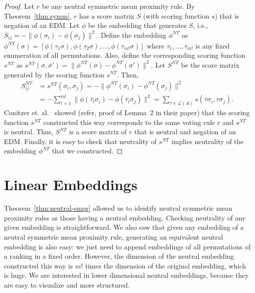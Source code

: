\documentclass[10pt,letterpaper]{article}
\newcommand{\calL}{{\mathcal{L}}}
\newcommand{\rank}{{\calL(A)}}
\newcommand{\nt}{NT}
\begin{document}
\begin{proof}
Let $r$ be any neutral symmetric mean proximity rule. By Theorem~\ref{thm:symm}, $r$ has a score matrix $S$ (with scoring function $s$) that is negation of an EDM. Let $\phi$ be the embedding that generates $S$, i.e., $S_{ij} = -\|\phi(\sigma_i)-\phi(\sigma_j)\|^2$. Define the embedding $\phi^{\nt}$ as $\phi^{\nt}(\sigma) = [\phi(\tau_1 \sigma), \phi(\tau_2 \sigma), \ldots, \phi(\tau_{m!} \sigma)]$ where $\tau_1,\ldots,\tau_{m!}$ is any fixed enumeration of all permutations. Also, define the corresponding scoring function $s^{\nt}$ as $s^{\nt}(\sigma,\sigma') = \|\phi^{\nt}(\sigma)-\phi^{\nt}(\sigma')\|^2$. Let $S^{\nt}$ be the score matrix generated by the scoring function $s^{\nt}$. Then, 
\begin{align*}
S^{\nt}_{ij} &= s^{\nt}(\sigma_i,\sigma_j) = -\|\phi^{\nt}(\sigma_i)-\phi^{\nt}(\sigma_j)\|^2 \\
&= - \sum_{l=1}^{m!} \|\phi(\tau_l \sigma_i)-\phi(\tau_l \sigma_j)\|^2 = \sum_{\tau \in \rank} s(\tau \sigma_i, \tau \sigma_j).
\end{align*}
Conitzer et. al.~\cite{CRX09} showed (refer, proof of Lemma~2 in their paper) that the scoring function $s^{\nt}$ constructed this way corresponds to the same voting rule $r$ and $s^{\nt}$ is neutral. Thus, $S^{\nt}$ is a score matrix of $r$ that is neutral and negation of an EDM. Finally, it is easy to check that neutrality of $s^{\nt}$ implies neutrality of the embedding $\phi^{\nt}$ that we constructed.
\end{proof}


\section{Linear Embeddings}

Theorem~\ref{thm:neutral-smpr} allowed us to identify neutral symmetric mean proximity rules as those having a neutral embedding. Checking neutrality of any given embedding is straightforward. We also saw that given any embedding of a neutral symmetric mean proximity rule, generating an equivalent neutral embedding is also easy: we just need to append embeddings of all permutations of a ranking in a fixed order. However, the dimension of the neutral embedding constructed this way is $m!$ times the dimension of the original embedding, which is huge. We are interested in lower dimensional neutral embeddings, because they are easy to visualize and more structured. 
\end{document}
